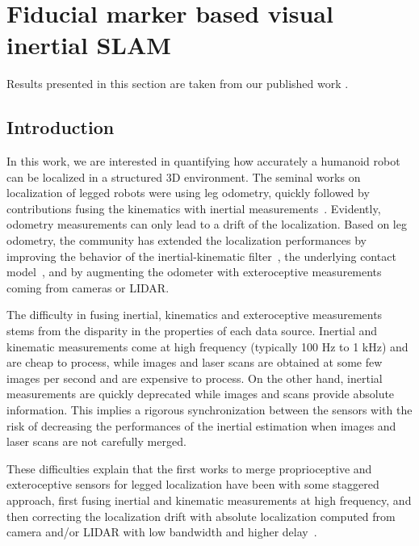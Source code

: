 \chapter{Fiducial marker based visual inertial SLAM}

Results presented in this section are taken from our published work \cite{fourmy2019absolute}.

\section{Introduction}

In this work, we are interested in quantifying how accurately a humanoid robot can be localized in a structured 3D environment.
The seminal works on localization of legged robots were using leg odometry, quickly followed by contributions fusing the kinematics 
with inertial measurements~\cite{lin_hexafusion_tro06}. Evidently, odometry measurements can only lead to a drift of the localization.
Based on leg odometry, the community has extended the localization performances by improving the behavior of the inertial-kinematic 
filter~\cite{bloesch2013state,rotella2014state,flayols2017experimental}, the underlying contact 
model~\cite{bledt2018cheetah,rotella2018unsupervised}, and by augmenting the odometer with exteroceptive measurements coming from cameras or LIDAR.


The difficulty in fusing inertial, kinematics and exteroceptive measurements stems from the disparity in the properties of each data source.
Inertial and kinematic measurements come at high frequency (typically 100 Hz to 1 kHz) and are cheap to process, while images and laser scans 
are obtained at some few images per second and are expensive to process. 
On the other hand, inertial measurements are quickly deprecated while images and scans provide absolute information.
This implies a rigorous synchronization between the sensors with the risk of decreasing the performances of the inertial 
estimation when images and laser scans are not carefully merged. 

These difficulties explain that the first works to merge proprioceptive and exteroceptive sensors for legged localization 
have been with some staggered approach, first fusing inertial and kinematic measurements at high frequency, and then correcting 
the localization drift with absolute localization computed from camera and/or LIDAR with low bandwidth and higher delay~\cite{nobili2017heterogeneous,fallon2014drift}.

